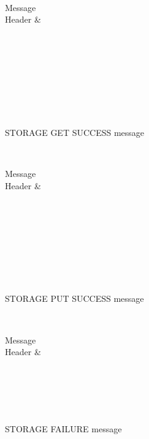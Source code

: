\documentclass[a4paper, 11pt]{article}
\begin{document}
\begin{figure}[H]
	\centering
	\begin{bytefield}[bitwidth=0.8em]{32}
		 \\
		\begin{rightwordgroup}{Message \\  Header}
			 & 
		\end{rightwordgroup} \\
		 \\
		\skippedwords \\
		 \\
		 \\
		\skippedwords \\
		 \\
	\end{bytefield}
	\caption{STORAGE GET SUCCESS message}
	\label{STORAGEGETSUCCESS}
\end{figure}

\begin{figure}[H]
	\centering
	\begin{bytefield}[bitwidth=0.8em]{32}
		 \\
		\begin{rightwordgroup}{Message \\  Header}
			 & 
		\end{rightwordgroup} \\
		 \\
		\skippedwords \\
		 \\
		 \\
		\skippedwords \\
		 \\
	\end{bytefield}
	\caption{STORAGE PUT SUCCESS message}
	\label{STORAGEPUTSUCCESS}
\end{figure}

\begin{figure}[H]
	\centering
	\begin{bytefield}[bitwidth=0.8em]{32}
		 \\
		\begin{rightwordgroup}{Message \\  Header}
			 & 
		\end{rightwordgroup} \\
		 \\
		\skippedwords \\
		 \\
	\end{bytefield}
	\caption{STORAGE FAILURE message}
	\label{STORAGEFAILURE}
\end{figure}
\end{document}

